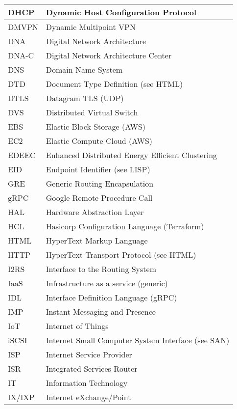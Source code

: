 \begin{longtable}{ll}
  DHCP		&		Dynamic Host Configuration Protocol		\\ \midrule
  DMVPN		&		Dynamic Multipoint VPN		\\ \midrule
  DNA		&		Digital Network Architecture		\\ \midrule
  DNA-C		&		Digital Network Architecture Center		\\ \midrule
  DNS		&		Domain Name System		\\ \midrule
  DTD		&		Document Type Definition (see HTML)		\\ \midrule
  DTLS		&		Datagram TLS (UDP)		\\ \midrule
  DVS		&		Distributed Virtual Switch		\\ \midrule
  EBS		&		Elastic Block Storage (AWS)		\\ \midrule
  EC2		&		Elastic Compute Cloud (AWS)		\\ \midrule
  EDEEC		&		Enhanced Distributed Energy Efficient Clustering		\\ \midrule
  EID		&		Endpoint Identifier (see LISP)		\\ \midrule
  GRE		&		Generic Routing Encapsulation		\\ \midrule
  gRPC		&		Google Remote Procedure Call		\\ \midrule
  HAL		&		Hardware Abstraction Layer		\\ \midrule
  HCL		&		Hasicorp Configuration Language (Terraform)		\\ \midrule
  HTML		&		HyperText Markup Language		\\ \midrule
  HTTP		&		HyperText Transport Protocol (see HTML)		\\ \midrule
  I2RS		&		Interface to the Routing System		\\ \midrule
  IaaS		&		Infrastructure as a service (generic)		\\ \midrule
  IDL		&		Interface Definition Language (gRPC)		\\ \midrule
  IMP		&		Instant Messaging and Presence		\\ \midrule
  IoT		&		Internet of Things		\\ \midrule
  iSCSI		&		Internet Small Computer System Interface (see SAN)		\\ \midrule
  ISP		&		Internet Service Provider		\\ \midrule
  ISR		&		Integrated Services Router		\\ \midrule
  IT		&		Information Technology		\\ \midrule
  IX/IXP	&		Internet eXchange/Point		\\ \midrule

\end{longtable}
